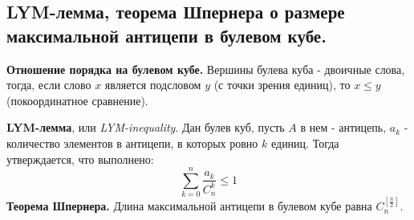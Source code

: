 \subsection{LYM-лемма, теорема Шпернера о размере максимальной антицепи в булевом кубе.}
\textbf{Отношение порядка на булевом кубе.} Вершины булева куба - двоичные слова, тогда, если слово $x$ является подсловом $y$ (с точки зрения единиц), то $x \leq y$ (покоординатное сравнение).

\textbf{LYM-лемма}, или \textit{LYM-inequality}. Дан булев куб, пусть $A$ в нем - антицепь, $a_k$ - количество элементов в антицепи, в которых ровно $k$ единиц. Тогда утверждается, что выполнено:
\[
\sum_{k = 0}^{n} \frac{a_k}{C_{n}^{k}} \leq 1 
\]
\noindent \textbf{Теорема Шпернера.} Длина максимальной антицепи в булевом кубе равна $C_{n}^{[\frac{n}{2}]}.$ \\

